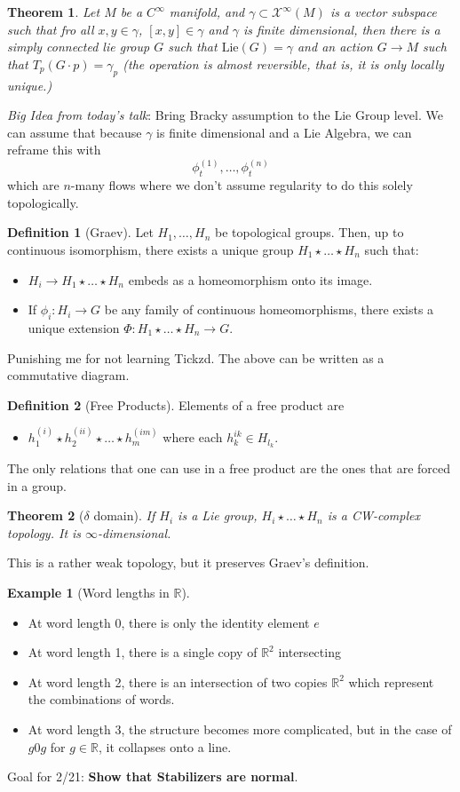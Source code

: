 \documentclass[psamsfonts]{amsart}
\newtheorem{thm}{Theorem}[section]
\theoremstyle{definition}
\newtheorem{defn}{Definition}[section]
\newtheorem{exmp}{Example}[section]
\numberwithin{equation}{section}
\newcommand{\R}{\mathbb{R}}
\begin{document}
\begin{thm}
    Let $M$ be a $C^\infty$ manifold, and $\gamma\subset \mathcal{X}^\infty(M)$ is a vector subspace such that fro all $x,y\in\gamma$, $[x,y]\in \gamma$
    and $\gamma$ is finite dimensional, then there is a simply connected lie group $G$ such that $\text{Lie}(G) = \gamma$ and an action $G\to M$ such that $T_p(G\cdot p) = \gamma_p$ (the operation is almost reversible, that is, it is only locally unique.)
\end{thm}
\textit{Big Idea from today's talk}: Bring Bracky assumption to the Lie Group level. \newline
We can assume that because $\gamma$ is finite dimensional and a Lie Algebra, we can reframe this with
\[\phi_t^{(1)},\dots,\phi_t^{(n)}\]
which are $n$-many flows where we don't assume regularity to do this solely topologically.\newline
\begin{defn}[Graev]
    Let $H_1,\dots,H_n$ be topological groups. Then, up to continuous isomorphism, there exists a unique group $H_1\star\dots\star H_n$ such that:
    \begin{itemize}
        \item $H_i \to H_1\star \dots\star H_n$ embeds as a homeomorphism onto its image.
        \item If $\phi_i : H_i\to G$ be any family of continuous homeomorphisms, there exists a unique extension $\Phi : H_1\star\dots\star H_n \to G$.
    \end{itemize} 
    Punishing me for not learning Tickzd. The above can be written as a commutative diagram.
\end{defn}
\begin{defn}[Free Products] Elements of a free product are
    \begin{itemize}
        \item $h_1^{(i)}\star h_2^{(ii)} \star \dots \star h_{m}^{(im)}$ where each $h_k^{ik}\in H_{l_k}$.
    \end{itemize}
    The only relations that one can use in a free product are the ones that are forced in a group.
\end{defn}
\begin{thm}[$\delta$ domain]
    If $H_i$ is a Lie group, $H_i\star\dots\star H_n$ is a CW-complex topology. It is $\infty$-dimensional.
\end{thm}
This is a rather weak topology, but it preserves Graev's definition.
\begin{exmp}[Word lengths in $\R$]
    \begin{itemize}
        \item At word length 0, there is only the identity element $e$
        \item At word length 1, there is a single copy of $\R^2$ intersecting
        \item At word length 2, there is an intersection of two copies $\R^2$ which represent the combinations of words.
        \item At word length 3, the structure becomes more complicated, but in the case of $g0g$ for $g\in \R$, it collapses onto a line.
    \end{itemize}
\end{exmp}
Goal for 2/21: \textbf{Show that Stabilizers are normal}.
\end{document}
